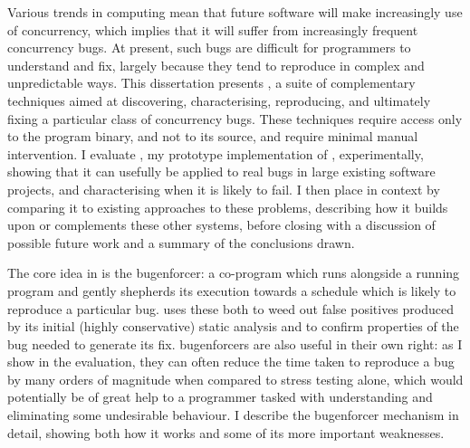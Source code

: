 \cleardoublepage
\newpage
\mbox{}
\newpage

\vspace*{\fill}
\centerline{{\bfseries \abstractname}}

\noindent
Various trends in computing mean that future software will make
increasingly use of concurrency, which implies that it will suffer
from increasingly frequent concurrency bugs.  At present, such bugs
are difficult for programmers to understand and fix, largely because
they tend to reproduce in complex and unpredictable ways.  This
dissertation presents {\technique}, a suite of complementary
techniques aimed at discovering, characterising, reproducing, and
ultimately fixing a particular class of concurrency bugs.  These
techniques require access only to the program binary, and not to its
source, and require minimal manual intervention.  I evaluate
{\implementation}, my prototype implementation of {\technique},
experimentally, showing that it can usefully be applied to real bugs
in large existing software projects, and characterising when it is
likely to fail.  I then place {\technique} in context by comparing it
to existing approaches to these problems, describing how it builds
upon or complements these other systems, before closing with a
discussion of possible future work and a summary of the conclusions
drawn.

The core idea in {\technique} is the \gls{bugenforcer}: a co-program
which runs alongside a running program and gently shepherds its
execution towards a schedule which is likely to reproduce a particular
bug.  {\Technique} uses these both to weed out false positives
produced by its initial (highly conservative) static analysis and to
confirm properties of the bug needed to generate its fix.
\Glspl{bugenforcer} are also useful in their own right: as I show in
the evaluation, they can often reduce the time taken to reproduce a
bug by many orders of magnitude when compared to stress testing alone,
which would potentially be of great help to a programmer tasked with
understanding and eliminating some undesirable behaviour.  I describe
the \gls{bugenforcer} mechanism in detail, showing both how it works
and some of its more important weaknesses.

\vspace*{\fill}

